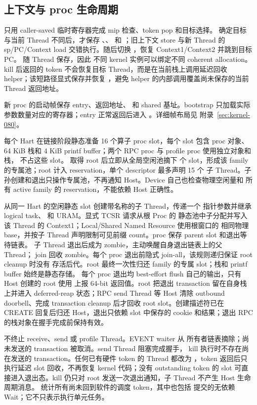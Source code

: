 \documentclass[../dayan_kernel_manual.tex]{subfiles}
\begin{document}
\subsection{上下文与 proc 生命周期}

 只用 caller-saved 临时寄存器完成 mip 检查、token pop 和目标选择。
确定目标与当前 Thread 不同后，才保存 、、 和
；旧上下文 store 与新 Thread 的 sp/PC/Context load 交错执行。随后切换
，恢复 Context1/Context2 并跳到目标 PC。 随 Thread 保存，因此
不同 kernel 实例可以绑定不同 coherent allocation。kill 后返回的 token 不会恢复目标
Thread，而是在当前栈上调用延迟回收 helper；该短路径显式保存并恢复 ，避免
helper 的内部调用覆盖尚未保存的当前 Thread 返回地址。

新 proc 的启动帧保存 entry、返回地址、 和 shared 基址。bootstrap
只加载实际参数数量对应的寄存器；entry 正常返回后进入 。详细帧布局见
附录~\ref{sec:kernel-080}。

每个 Hart 在链接阶段静态准备 16 个算子 proc slot，每个 slot 包含 proc 对象、64 KiB
栈和 4 KiB printf buffer；两个 RPC proc 与 profile proc 使用独立对象和栈，
不占这些 slot。
 取得 root 后立即从全局空闲池摘下  个
slot，形成该 family 的专属池；root 计入 reservation，单个 descriptor 最多声明 15 个
子 Thread。子孙创建和退出只操作专属池，不再通知 Host。Device 自己也检查物理空闲量和
所有 active family 的 reservation，不能依赖 Host 正确性。

 从同一 Hart 的空闲静态 slot 创建带名称的子 Thread，传递一个
指针参数并继承 logical task、 和 URAM。显式 TCSR 请求从根 Proc 的
静态池中子分配并写入该 Thread 的 Context1；Local/Shared Named Resource 使用根窗口的
相同物理 base，并按子 Thread 声明限制可见前缀 count。proc 保存 parent slot 和退出等待链表。
子 Thread 退出后成为 zombie，主动唤醒自身退出链表上的父 Thread；
join 回收 zombie。每个 proc 退出前隐式 join-all，该规则递归保证 root cleanup 时没有
存活后代。root 最终一次性归还 family 的专属 slot；栈和 printf buffer 始终是静态存储。
每个 proc 退出均 best-effort flush 自己的输出，只有 Host 创建的 root 使用
 上报 64-bit 返回值。root 把退出 transaction 留在自身栈上并进入
deferred-reap 状态；RPC send Thread 等 Host 清除 outbound doorbell、完成 transaction
cleanup 后才回收 root slot。创建描述符已在 CREATE 回复后归还 Host，退出只依赖
slot 中保存的 cookie 和结果；退出 RPC 的栈对象在握手完成前保持有效。

 不终止 receive、send 或 profile Thread。EVENT waiter 从
所有者链表摘除；尚未发送的 transaction 被取消。send Thread 阻塞完成握手，
kill 执行时不存在尚在发送的 transaction。任何已有硬件 token 的 Thread 都改为
，token 返回后只执行延迟 slot 回收，不再恢复 kernel 代码；没有
outstanding token 的 slot 可直接进入退出态。kill 仍只对 root 发送一次退出通知，子
Thread 不产生 Host 生命周期消息。 统计所有尚未回到软件的调度
token，其中也包括  提交的无依赖 Wait；它不只表示执行单元任务。
\end{document}

